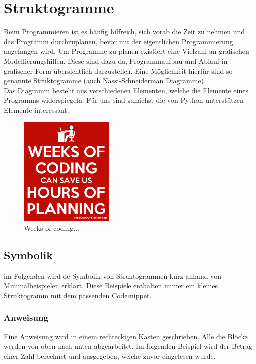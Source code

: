 \section{Struktogramme}
Beim Programmieren ist es häufig hilfreich, sich vorab die Zeit zu nehmen und das Programm durchzuplanen, bevor mit der eigentlichen Programmierung angefangen wird. Um Programme zu planen existiert eine Vielzahl an grafischen Modellierungshilfen. Diese sind dazu da, Programmaufbau und Ablauf in grafischer Form übersichtlich darzustellen. Eine Möglichkeit hierfür sind so genannte Struktogramme (auch Nassi-Schneiderman Diagramme). \\
Das Diagramm besteht aus verschiedenen Elementen, welche die Elemente eines Programms widerspiegeln. Für uns sind zunächst die von Python unterstützen Elemente interessant.

\begin{figure}[H]
	\begin{center}
		\includegraphics[width=0.4\textwidth]{imgs/weeks_coding.png} %
		\caption{Weeks of coding...}
	\end{center}
\end{figure}

\subsection{Symbolik} \label{sec:Symbolik}
im Folgenden wird de Symbolik von Struktogrammen kurz anhand von Minimalbeispielen erklärt. Diese Beispiele enthalten immer ein kleines Struktogramm mit dem passenden Codesnippet.
\subsubsection{Anweisung}
Eine Anweisung wird in einem rechteckigen Kasten geschrieben. Alle die Blöcke werden von oben nach unten abgearbeitet. Im folgenden Beispiel wird der Betrag einer Zahl berechnet und ausgegeben, welche zuvor eingelesen wurde.\\

